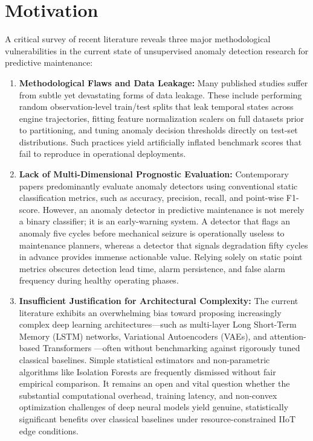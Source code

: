 \documentclass[12pt,a4paper,oneside]{report}
\begin{document}
\section{Motivation}
A critical survey of recent literature reveals three major methodological vulnerabilities in the current state of unsupervised anomaly detection research for predictive maintenance:
\begin{enumerate}
    \item \textbf{Methodological Flaws and Data Leakage:} Many published studies suffer from subtle yet devastating forms of data leakage. These include performing random observation-level train/test splits that leak temporal states across engine trajectories, fitting feature normalization scalers on full datasets prior to partitioning, and tuning anomaly decision thresholds directly on test-set distributions. Such practices yield artificially inflated benchmark scores that fail to reproduce in operational deployments.
    \item \textbf{Lack of Multi-Dimensional Prognostic Evaluation:} Contemporary papers predominantly evaluate anomaly detectors using conventional static classification metrics, such as accuracy, precision, recall, and point-wise F1-score. However, an anomaly detector in predictive maintenance is not merely a binary classifier; it is an early-warning system. A detector that flags an anomaly five cycles before mechanical seizure is operationally useless to maintenance planners, whereas a detector that signals degradation fifty cycles in advance provides immense actionable value. Relying solely on static point metrics obscures detection lead time, alarm persistence, and false alarm frequency during healthy operating phases.
    \item \textbf{Insufficient Justification for Architectural Complexity:} The current literature exhibits an overwhelming bias toward proposing increasingly complex deep learning architectures—such as multi-layer Long Short-Term Memory (LSTM) networks, Variational Autoencoders (VAEs), and attention-based Transformers \cite{malhotra2016lstm, vaswani2017attention, kingma2014auto}—often without benchmarking against rigorously tuned classical baselines. Simple statistical estimators and non-parametric algorithms like Isolation Forests \cite{liu2008isolation} are frequently dismissed without fair empirical comparison. It remains an open and vital question whether the substantial computational overhead, training latency, and non-convex optimization challenges of deep neural models yield genuine, statistically significant benefits over classical baselines under resource-constrained IIoT edge conditions.
\end{enumerate}
\end{document}
